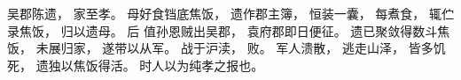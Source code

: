
\switchcolumn*[\section{}]

吴郡陈遗，
家至孝。
母好食铛底焦饭，
遗作郡主簿，
恒装一囊，
每煮食，
辄伫录焦饭，
归以遗母。
后
值孙恩贼出吴郡，
袁府郡即日便征。
遗已聚敛得数斗焦饭，
未展归家，
遂带以从军。
战于沪渎，
败。
军人溃散，
逃走山泽，
皆多饥死，
遗独以焦饭得活。
时人以为纯孝之报也。

\switchcolumn


